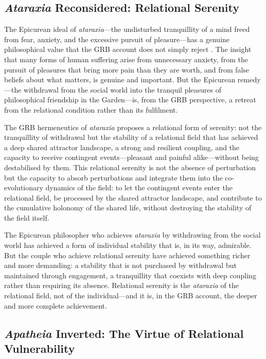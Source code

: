 \subsection{\emph{Ataraxia} Reconsidered: Relational Serenity}
\label{p14:subsec:ataraxia}

\noindent
The Epicurean ideal of \emph{ataraxia}---the undisturbed tranquillity of a mind freed from fear, anxiety, and the excessive pursuit of pleasure---has a genuine philosophical value that the GRB account does not simply reject \parencite{epicurus1994}. The insight that many forms of human suffering arise from unnecessary anxiety, from the pursuit of pleasures that bring more pain than they are worth, and from false beliefs about what matters, is genuine and important. But the Epicurean remedy---the withdrawal from the social world into the tranquil pleasures of philosophical friendship in the Garden---is, from the GRB perspective, a retreat from the relational condition rather than its fulfilment.

The GRB hermeneutics of \emph{ataraxia} proposes a relational form of serenity: not the tranquillity of withdrawal but the stability of a relational field that has achieved a deep shared attractor landscape, a strong and resilient coupling, and the capacity to receive contingent events---pleasant and painful alike---without being destabilised by them. This relational serenity is not the absence of perturbation but the capacity to absorb perturbations and integrate them into the co-evolutionary dynamics of the field: to let the contingent events enter the relational field, be processed by the shared attractor landscape, and contribute to the cumulative holonomy of the shared life, without destroying the stability of the field itself.

The Epicurean philosopher who achieves \emph{ataraxia} by withdrawing from the social world has achieved a form of individual stability that is, in its way, admirable. But the couple who achieve relational serenity have achieved something richer and more demanding: a stability that is not purchased by withdrawal but maintained through engagement, a tranquillity that coexists with deep coupling rather than requiring its absence. Relational serenity is the \emph{ataraxia} of the relational field, not of the individual---and it is, in the GRB account, the deeper and more complete achievement.

\subsection{\emph{Apatheia} Inverted: The Virtue of Relational Vulnerability}
\label{p14:subsec:apatheia}

